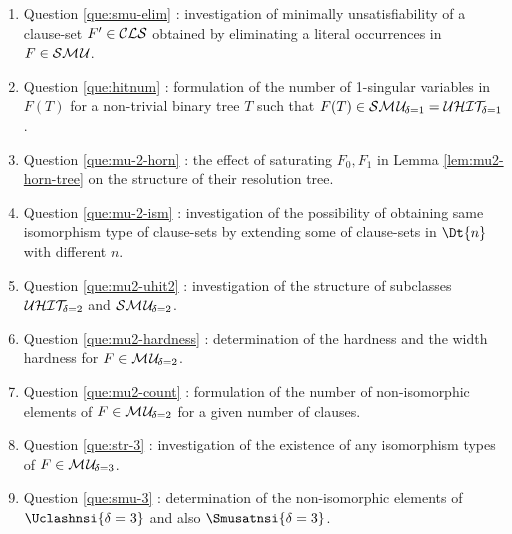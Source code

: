 \documentclass{report}
\begin{document}
\begin{enumerate}
  \item Question \ref{que:smu-elim} : investigation of minimally unsatisfiability of a clause-set $F' \in \mathcal{CLS} $ obtained by eliminating a literal occurrences in $F \in \mathcal{S}\mathcal{M\hspace{0.8pt}U}$.
  \item Question \ref{que:hitnum} : formulation of the number of 1-singular variables in $F(T)$ for a non-trivial binary tree $T$ such that $F(T) \in \mathcal{S}\mathcal{M\hspace{0.8pt}U}_{\!\delta=1}=\mathcal{U}\mathcal{HIT}_{\!\!\delta=1}$.
  \item Question \ref{que:mu-2-horn} : the effect of saturating $F_0, F_1$ in Lemma \ref{lem:mu2-horn-tree} on the structure of their resolution tree.
  \item Question \ref{que:mu-2-ism} : investigation of the possibility of obtaining same isomorphism type of clause-sets by extending some of clause-sets in $\Dt{n}$ with different $n$.
  \item Question \ref{que:mu2-uhit2} : investigation of the structure of subclasses $\mathcal{U}\mathcal{HIT}_{\!\!\delta=2}$ and $\mathcal{S}\mathcal{M\hspace{0.8pt}U}_{\!\delta=2}$.
  \item Question \ref{que:mu2-hardness} : determination of the hardness and the width hardness for $F \in \mathcal{M\hspace{0.8pt}U}_{\!\delta=2}$.
  \item Question \ref{que:mu2-count} : formulation of the number of non-isomorphic elements of $F \in \mathcal{M\hspace{0.8pt}U}_{\!\delta=2}$ for a given number of clauses.
  \item Question \ref{que:str-3} : investigation of the existence of any isomorphism types of $F \in \mathcal{M\hspace{0.8pt}U}_{\!\delta=3}$.
  \item Question \ref{que:smu-3} : determination of the non-isomorphic elements of $\Uclashnsi{\delta=3}$ and also $\Smusatnsi{\delta=3}$.
  \end{enumerate}


\BibliographyOKlibrary
\end{document}
